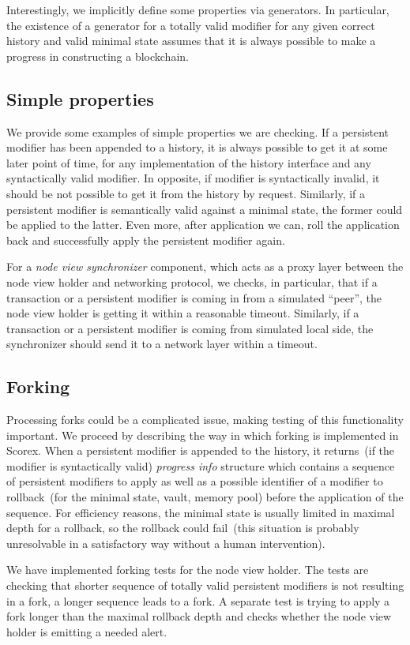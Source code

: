 Interestingly, we implicitly define some properties via generators. In particular, the existence of a generator for a totally valid modifier for any given correct history and valid minimal state assumes that it is always possible to make a progress in constructing a blockchain.

\subsection{Simple properties}
\label{sec:simple-props}

We provide some examples of simple properties we are checking. If a persistent modifier has been appended to a history, it is always possible to get it at some later point of time, for any implementation of the history interface and any syntactically valid modifier. In opposite, if modifier is syntactically invalid, it should be not possible to get it from the history by request. Similarly, if a persistent modifier is semantically valid against a minimal state, the former could be applied to the latter. Even more, after application we can, roll the application back and successfully apply the persistent modifier again.  

For a {\em node view synchronizer} component, which acts as a proxy layer between the node view holder and networking protocol, we checks, in particular, that if a transaction or a persistent modifier is coming in from a simulated ``peer'', the node view holder is getting it within a reasonable timeout. Similarly, if a transaction or a persistent modifier is coming from simulated local side, the synchronizer should send it to a network layer within a timeout.

\subsection{Forking}
\label{sec:forking}

Processing forks could be a complicated issue, making testing of this functionality important. We proceed by describing the way in which forking is implemented in Scorex. When a persistent modifier is appended to the history, it returns~(if the modifier is syntactically valid) {\em progress info} structure which contains a sequence of persistent modifiers to apply as well as a possible identifier of a modifier to rollback~(for the minimal state, vault, memory pool) before the application of the sequence. For efficiency reasons, the minimal state is usually limited in maximal depth for a rollback, so the rollback could fail~(this situation is probably unresolvable in a satisfactory way without a human intervention). 

We have implemented forking tests for the node view holder. The tests are checking that shorter sequence of totally valid persistent modifiers is not resulting in a fork, a longer sequence leads to a fork. A separate test is trying to apply a fork longer than the maximal rollback depth and checks whether the node view holder is emitting a needed alert.
